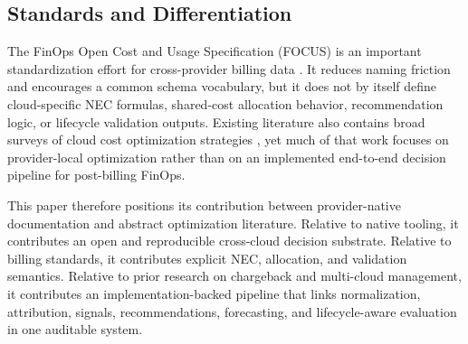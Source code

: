 \subsection{Standards and Differentiation}
The FinOps Open Cost and Usage Specification (FOCUS) is an important standardization effort for cross-provider billing data \cite{focus_v12}. It reduces naming friction and encourages a common schema vocabulary, but it does not by itself define cloud-specific NEC formulas, shared-cost allocation behavior, recommendation logic, or lifecycle validation outputs. Existing literature also contains broad surveys of cloud cost optimization strategies \cite{liu2023cost}, yet much of that work focuses on provider-local optimization rather than on an implemented end-to-end decision pipeline for post-billing FinOps.

This paper therefore positions its contribution between provider-native documentation and abstract optimization literature. Relative to native tooling, it contributes an open and reproducible cross-cloud decision substrate. Relative to billing standards, it contributes explicit NEC, allocation, and validation semantics. Relative to prior research on chargeback and multi-cloud management, it contributes an implementation-backed pipeline that links normalization, attribution, signals, recommendations, forecasting, and lifecycle-aware evaluation in one auditable system.
